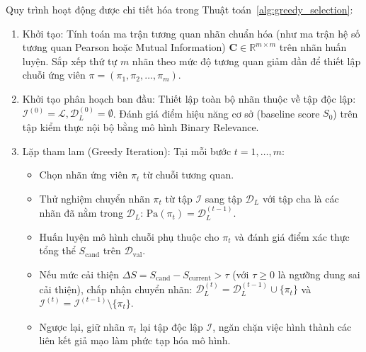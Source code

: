 \documentclass[11pt,a4paper]{article}
\begin{document}
Quy trình hoạt động được chi tiết hóa trong Thuật toán~\ref{alg:greedy_selection}:
\begin{enumerate}
    \item Khởi tạo: Tính toán ma trận tương quan nhãn chuẩn hóa (như ma trận hệ số tương quan Pearson hoặc Mutual Information) $\mathbf{C} \in \mathbb{R}^{m \times m}$ trên nhãn huấn luyện. Sắp xếp thứ tự $m$ nhãn theo mức độ tương quan giảm dần để thiết lập chuỗi ứng viên $\pi = (\pi_1, \pi_2, \dots, \pi_m)$.
    \item Khởi tạo phân hoạch ban đầu: Thiết lập toàn bộ nhãn thuộc về tập độc lập: $\mathcal{I}^{(0)} = \mathcal{L}, \mathcal{D}_L^{(0)} = \emptyset$. Đánh giá điểm hiệu năng cơ sở (baseline score $S_0$) trên tập kiểm thực nội bộ bằng mô hình Binary Relevance.
    \item Lặp tham lam (Greedy Iteration): Tại mỗi bước $t = 1, \dots, m$:
    \begin{itemize}
        \item Chọn nhãn ứng viên $\pi_t$ từ chuỗi tương quan.
        \item Thử nghiệm chuyển nhãn $\pi_t$ từ tập $\mathcal{I}$ sang tập $\mathcal{D}_L$ với tập cha là các nhãn đã nằm trong $\mathcal{D}_L$: $\mathrm{Pa}(\pi_t) = \mathcal{D}_L^{(t-1)}$.
        \item Huấn luyện mô hình chuỗi phụ thuộc cho $\pi_t$ và đánh giá điểm xác thực tổng thể $S_{\mathrm{cand}}$ trên $\mathcal{D}_{\mathrm{val}}$.
        \item Nếu mức cải thiện $\Delta S = S_{\mathrm{cand}} - S_{\mathrm{current}} > \tau$ (với $\tau \ge 0$ là ngưỡng dung sai cải thiện), chấp nhận chuyển nhãn: $\mathcal{D}_L^{(t)} = \mathcal{D}_L^{(t-1)} \cup \{\pi_t\}$ và $\mathcal{I}^{(t)} = \mathcal{I}^{(t-1)} \setminus \{\pi_t\}$.
        \item Ngược lại, giữ nhãn $\pi_t$ lại tập độc lập $\mathcal{I}$, ngăn chặn việc hình thành các liên kết giả mạo làm phức tạp hóa mô hình.
    \end{itemize}
\end{enumerate}
\end{document}
